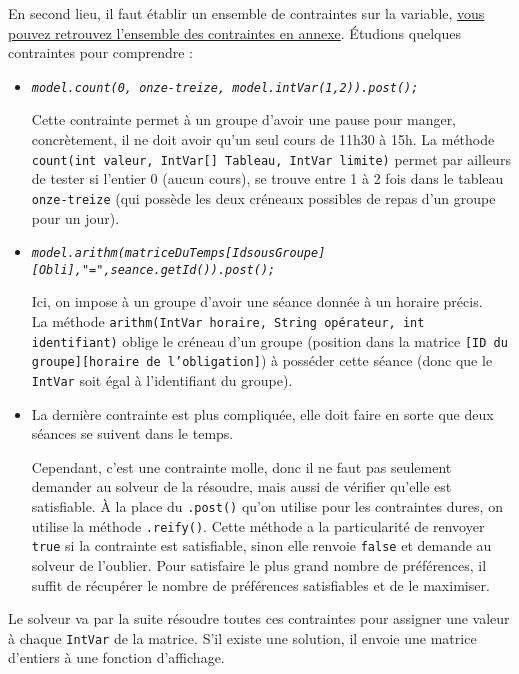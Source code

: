 \documentclass[12pt,a4paper]{article}
\begin{document}
En second lieu, il faut établir un ensemble de contraintes sur la variable, \hyperref[listContraintes]{vous pouvez retrouvez l'ensemble des contraintes en annexe}. \'Etudions quelques contraintes pour comprendre :
\begin{itemize}[label=\textbullet]
\item 
\textit{\texttt{model.count(0, onze-treize, model.intVar(1,2)).post();}}

Cette contrainte permet à un groupe d'avoir une pause pour manger, concrètement, il ne doit avoir qu'un seul cours de 11h30 à 15h.
La méthode \texttt{count(int valeur, IntVar[] Tableau, IntVar limite)} permet par ailleurs de tester si l'entier 0 (aucun cours), se trouve entre 1 à 2 fois dans le tableau \texttt{onze-treize} (qui possède les deux créneaux possibles de repas d'un groupe pour un jour).

\item
\textit{\texttt{model.arithm(matriceDuTemps[IdsousGroupe][Obli],"=",seance.getId()).post();}}

Ici, on impose à un groupe d'avoir une séance donnée à un horaire précis. \\La méthode \texttt{arithm(IntVar horaire, String opérateur, int identifiant)} oblige le créneau d'un groupe (position dans la matrice \texttt{[ID du groupe][horaire de l'obligation]}) à posséder cette séance (donc que le \texttt{IntVar} soit égal à l'identifiant du groupe).

\item La dernière contrainte est plus compliquée, elle doit faire en sorte que deux séances se suivent dans le temps.

Cependant, c'est une contrainte molle, donc il ne faut pas seulement demander au solveur de la résoudre, mais aussi de vérifier qu'elle est satisfiable. \`A la place du \texttt{.post()} qu'on utilise pour les contraintes dures, on utilise la méthode \texttt{.reify()}. Cette méthode a la particularité de renvoyer \texttt{true} si la contrainte est satisfiable, sinon elle renvoie \texttt{false} et demande au solveur de l'oublier. Pour satisfaire le plus grand nombre de préférences, il suffit de récupérer le nombre de préférences satisfiables et de le maximiser.
\end{itemize}

Le solveur va par la suite résoudre toutes ces contraintes pour assigner une valeur à chaque \texttt{IntVar} de la matrice. S'il existe une solution, il envoie une matrice d'entiers à une fonction d'affichage.
\end{document}

